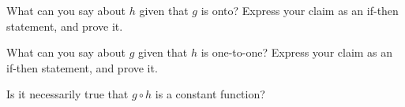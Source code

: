 \begin{enumerate}
\begin{enumerate}
    \Part  What can you say about $h$ given that $g$ is onto?  Express
    your claim as an if-then statement, and prove it. 
    \vfill
    \vfill

    \Part What can you say about $g$ given that $h$ is one-to-one?
    Express your claim as an if-then statement, and prove it. 
    \vfill
    \vfill
    
    \Part Is it necessarily true that $g\circ h$ is a constant
    function? 
    \vfill
  \end{enumerate}
  

\end{enumerate}

%

